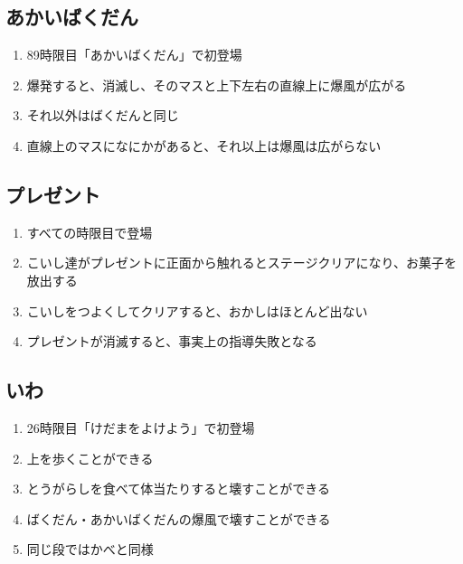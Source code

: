 \subsection{あかいばくだん}
\begin{enumerate}[label={\sarrow}]
\item 89時限目「あかいばくだん」で初登場
\item 爆発すると、消滅し、そのマスと上下左右の直線上に爆風が広がる
\item それ以外はばくだんと同じ
\item 直線上のマスになにかがあると、それ以上は爆風は広がらない
\end{enumerate}


\clearpage



\subsection{プレゼント}
\begin{enumerate}[label={\sarrow}]
\item すべての時限目で登場
\item こいし達がプレゼントに正面から触れるとステージクリアになり、お菓子を放出する
\item こいしをつよくしてクリアすると、おかしはほとんど出ない
\item プレゼントが消滅すると、事実上の指導失敗となる
\end{enumerate}


\subsection{いわ}
\begin{enumerate}[label={\sarrow}]
\item 26時限目「けだまをよけよう」で初登場
\item 上を歩くことができる
\item とうがらしを食べて体当たりすると壊すことができる
\item ばくだん・あかいばくだんの爆風で壊すことができる
\item 同じ段ではかべと同様
\end{enumerate}


